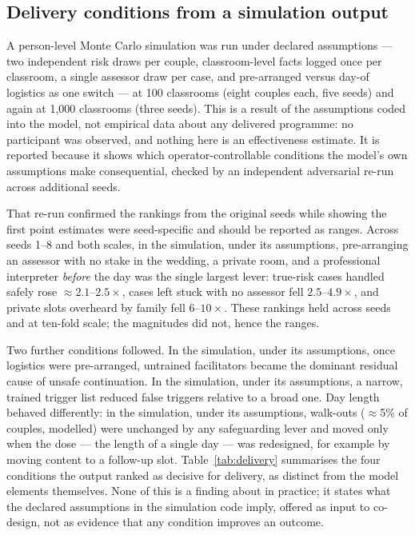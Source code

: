 
\subsection{Delivery conditions from a simulation output}
A person-level Monte Carlo simulation was run under declared assumptions --- two independent risk
draws per couple, classroom-level facts logged once per classroom, a single assessor draw per case,
and pre-arranged versus day-of logistics as one switch --- at 100 classrooms (eight couples each, five
seeds) and again at 1,000 classrooms (three seeds). This is a result of the assumptions coded into
the model, not empirical data about any delivered programme: no participant was observed, and nothing
here is an effectiveness estimate. It is reported because it shows which operator-controllable
conditions the model's own assumptions make consequential, checked by an independent adversarial
re-run across additional seeds.

That re-run confirmed the rankings from the original seeds while showing the first point estimates
were seed-specific and should be reported as ranges. Across seeds 1--8 and both scales, in the
simulation, under its assumptions, pre-arranging an assessor with no stake in the wedding, a private
room, and a professional interpreter \emph{before} the day was the single largest lever: true-risk
cases handled safely rose $\approx\!2.1$--$2.5\times$, cases left stuck with no assessor fell
$2.5$--$4.9\times$, and private slots overheard by family fell $6$--$10\times$. These rankings held
across seeds and at ten-fold scale; the magnitudes did not, hence the ranges.

Two further conditions followed. In the simulation, under its assumptions, once logistics were
pre-arranged, untrained facilitators became the dominant residual cause of unsafe continuation. In the
simulation, under its assumptions, a narrow, trained trigger list reduced false triggers relative to a
broad one. Day length behaved differently: in the simulation, under its assumptions, walk-outs
($\approx$5\% of couples, modelled) were unchanged by any safeguarding lever and moved only when the
dose --- the length of a single day --- was redesigned, for example by moving content to a follow-up
slot. Table~\ref{tab:delivery} summarises the four conditions the output ranked as decisive for
delivery, as distinct from the model elements themselves. None of this is a finding about \tphe{} in
practice; it states what the declared assumptions in the simulation code imply, offered as input to
co-design, not as evidence that any condition improves an outcome.

